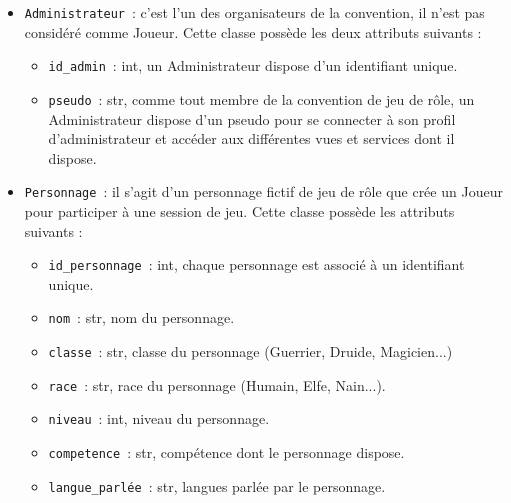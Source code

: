 \documentclass[11pt]{article}
\begin{document}
\bigbreak

\begin{itemize}
    \item \texttt{Administrateur}~: c'est l'un des organisateurs de la convention, il n’est pas considéré comme Joueur. Cette classe possède les deux attributs suivants :
    \begin{itemize}[label=, font=\small]
        \item \texttt{id\_admin}~: int, un Administrateur dispose d'un identifiant unique.
        \item \texttt{pseudo}~: str, comme tout membre de la convention de jeu de rôle, un Administrateur dispose d'un pseudo pour se connecter à son profil d'administrateur et accéder aux différentes vues et services dont il dispose.
    \end{itemize}
    
    \item \texttt{Personnage}~: il s'agit d'un personnage fictif de jeu de rôle que crée un Joueur pour participer à une session de jeu. Cette classe possède les attributs suivants :
    \begin{itemize}[label=, font=\small]
        \item \texttt{id\_personnage}~: int, chaque personnage est associé à un identifiant unique.
        \item \texttt{nom}~: str, nom du personnage.
        \item \texttt{classe}~: str, classe du personnage (Guerrier, Druide, Magicien...)
        \item \texttt{race}~: str, race du personnage (Humain, Elfe, Nain...).
        \item \texttt{niveau}~: int, niveau du personnage.
        \item \texttt{competence}~: str, compétence dont le personnage dispose.
        \item \texttt{langue\_parlée}~: str, langues parlée par le personnage.
    \end{itemize}


\end{itemize}
\end{document}
